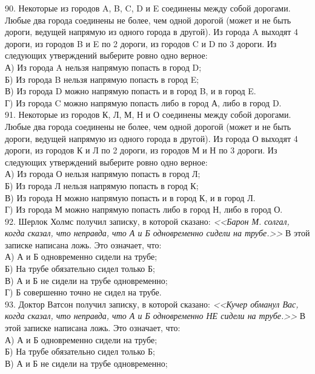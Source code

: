 \documentclass[12pt]{article}
\begin{document}
90. Некоторые из городов A, B, C, D и E соединены между собой дорогами. Любые два города соединены не более, чем одной дорогой (может и не быть дороги, ведущей напрямую из одного города в другой). Из города A выходят 4 дороги, из городов B и E по 2 дороги, из городов C и D по 3 дороги. Из следующих утверждений выберите ровно одно верное:\\
А) Из города A нельзя напрямую попасть в город D;\\
Б) Из города B нельзя напрямую попасть в город E;\\
В) Из города D можно напрямую попасть и в город B, и в город E.\\
Г) Из города C можно напрямую попасть либо в город А, либо в город D.\\
91. Некоторые из городов К, Л, М, Н и О соединены между собой дорогами. Любые два города соединены не более, чем одной дорогой (может и не быть дороги, ведущей напрямую из одного города в другой). Из города О выходят 4 дороги, из городов К и Л по 2 дороги, из городов М и Н по 3 дороги. Из следующих утверждений выберите ровно одно верное:\\
А) Из города О нельзя напрямую попасть в город Л;\\
Б) Из города Л нельзя напрямую попасть в город К;\\
В) Из города Н можно напрямую попасть и в город К, и в город Л.\\
Г) Из города М можно напрямую попасть либо в город Н, либо в город О.\\
92. Шерлок Холмс получил записку, в которой сказано: {\it <<Барон М. солгал, когда сказал, что неправда, что А и Б одновременно сидели на трубе.>>} В этой записке написана ложь. Это означает, что:\\
А) А и Б одновременно сидели на трубе;\\
Б) На трубе обязательно сидел только Б;\\
В) А и Б не сидели на трубе одновременно;\\
Г) Б совершенно точно не сидел на трубе.\\
93. Доктор Ватсон получил записку, в которой сказано: {\it <<Кучер обманул Вас, когда сказал, что неправда, что А и Б одновременно НЕ сидели на трубе.>>} В этой записке написана ложь. Это означает, что:\\
А) А и Б одновременно сидели на трубе;\\
Б) На трубе обязательно сидел только Б;\\
В) А и Б не сидели на трубе одновременно;\\
\end{document}
